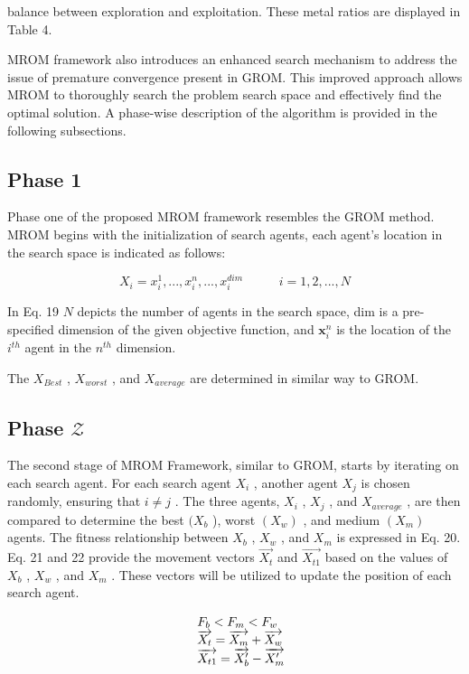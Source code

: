 balance between exploration and exploitation. These metal ratios are displayed in Table 4.

MROM framework also introduces an enhanced search mechanism to address the issue of premature convergence present in GROM. This improved approach allows MROM to thoroughly search the problem search space and effectively find the optimal solution. A phase-wise description of the algorithm is provided in the following subsections.

\subsection{Phase 1}

Phase one of the proposed MROM framework resembles the GROM method. MROM begins with the initialization of search agents, each agent’s location in the search space is indicated as follows:

\begin{equation}
X_{i}=x_{i}^{1},...,x_{i}^{n},...,x_{i}^{d i m}\phantom{...\qquad}i=1,2,...,N
\end{equation}

In Eq. 19 $N$ depicts the number of agents in the search space, dim is a pre-specified dimension of the given objective function, and $\boldsymbol{x}_{i}^{n}$ is the location of the $i^{t h}$ agent in the $n^{t h}$ dimension.

The $X_{B e s t}$ , $X_{w o r s t}$ , and $X_{a v e r a g e}$ are determined in similar way to GROM.

\subsection{Phase $\mathcal{Z}$}

The second stage of MROM Framework, similar to GROM, starts by iterating on each search agent. For each search agent $X_{i}$ , another agent $X_{j}$ is chosen randomly, ensuring that $i\neq j$ . The three agents, $X_{i}$ , $X_{j}$ , and $X_{a v e r a g e}$ , are then compared to determine the best $(X_{b}$ ), worst $\left({{X}_{w}}\right)$ , and medium $\left(X_{m}\right)$ agents. The fitness relationship between $X_{b}$ , $X_{w}$ , and $X_{m}$ is expressed in Eq. 20. Eq. 21 and 22 provide the movement vectors $\overrightarrow{X_{t}}$ and $\overrightarrow{X_{t1}}$ based on the values of $X_{b}$ , $X_{w}$ , and $X_{m}$ . These vectors will be utilized to update the position of each search agent.

\begin{equation}
\begin{array}{r l}&{F_{b}<F_{m}<F_{w}}\\ &{\overrightarrow{X_{t}}=\overrightarrow{X_{m}}+\overrightarrow{X_{w}}}\\ &{\overrightarrow{X_{t1}}=\overrightarrow{X_{b}^{\prime}}-\overrightarrow{X_{m}^{\prime}}}\end{array}
\end{equation}

